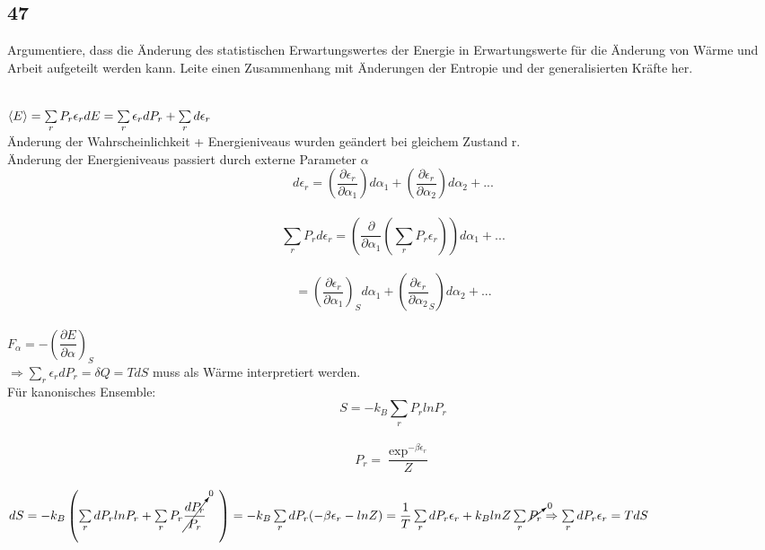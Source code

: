 \subsection{47}
\begin{myfrag}
Argumentiere, dass die Änderung des statistischen Erwartungswertes der Energie
in Erwartungswerte für die Änderung von Wärme und Arbeit aufgeteilt werden
kann. Leite einen Zusammenhang mit Änderungen der Entropie und der
generalisierten Kräfte her.
\end{myfrag} \quad \\
$\left\langle E \right\rangle = \sum \limits _r P_r \epsilon _r \\[1.5ex]
dE = \sum \limits_r \epsilon _r dP_r + \sum \limits_r d\epsilon_r$ \\
Änderung der Wahrscheinlichkeit + Energieniveaus wurden geändert bei gleichem Zustand r. \\
Änderung der Energieniveaus passiert durch externe Parameter $\alpha $ \\[1.ex]
$$d \epsilon _r = \left( \dfrac{\partial \epsilon _r}{\partial \alpha _1} \right) d \alpha _1 + \left( \dfrac{\partial \epsilon _r}{\partial \alpha _2} \right) d \alpha _2 + ... $$\\$$
\sum \limits_r P_r d \epsilon _r = \left( \dfrac{\partial }{\partial \alpha _1}\left(\sum \limits_r P_r \epsilon _r \right)\right) d \alpha _1 + ...$$ \\$$
= \left( \dfrac{\partial \epsilon _r}{\partial \alpha _1} \right)_S d \alpha _1+ \left( \dfrac{\partial \epsilon _r}{\partial \alpha _2}_S \right) d \alpha _2 + ...$$
\\[1.5ex]
$F_\alpha = - \left(\dfrac{\partial E}{\partial\alpha} \right) _S $ \\[1.5ex]
$\Rightarrow \sum \limits_r \epsilon_r dP_r = \delta Q = TdS $ muss als Wärme interpretiert werden. \\[2ex]
Für kanonisches Ensemble:\\[1.5ex]
$$ S= -k_B \sum \limits _r P_r ln P_r $$
\\
$$P_r = \dfrac{ \exp ^{-\beta \epsilon _r}}{Z}$$ \\[1ex]
$dS = -k_B \left(  \sum \limits_r dP_r lnP_r + \sum \limits _r P_r  \cancelto{0}{ \dfrac{dP_r}{P_r}}\quad \right) \\[1ex]
= -k_B \sum \limits _r dP_r (-\beta \epsilon_r - lnZ)
\\[1ex]
=\dfrac{1}{T}\sum \limits _r dP_r \epsilon _r + k_B lnZ \sum \limits_r \cancelto{0}{P_r} 
\\[1.5ex]
\Rightarrow \sum \limits_r dP_r \epsilon _r = TdS$
